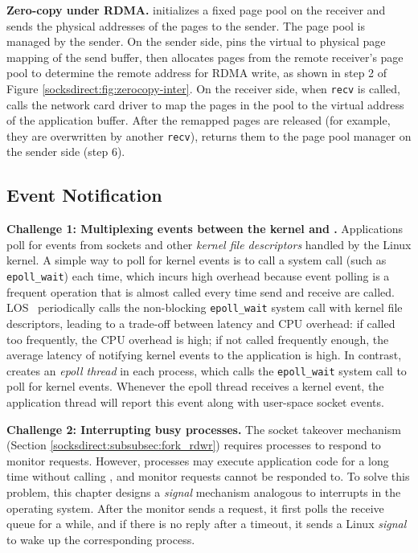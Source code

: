 \textbf{Zero-copy under RDMA.}
\libipc{} initializes a fixed page pool on the receiver and sends the physical addresses of the pages to the sender.
The page pool is managed by the sender.
On the sender side, \libipc{} pins the virtual to physical page mapping of the send buffer, then allocates pages from the remote receiver's page pool to determine the remote address for RDMA write, as shown in step 2 of Figure \ref{socksdirect:fig:zerocopy-inter}.
On the receiver side, when \texttt{recv} is called, \libipc calls the network card driver to map the pages in the pool to the virtual address of the application buffer.
After the remapped pages are released (for example, they are overwritten by another \texttt{recv}), \libipc{} returns them to the page pool manager on the sender side (step 6).

\subsection{Event Notification}
\label{socksdirect:subsec:process-mux}

\textbf{Challenge 1: Multiplexing events between the kernel and \libipc{}.}
Applications poll for events from sockets and other \textit{kernel file descriptors} handled by the Linux kernel.
A simple way to poll for kernel events is to call a system call (such as \texttt{epoll\_wait}) each time, which incurs high overhead because event polling is a frequent operation that is almost called every time send and receive are called.
LOS~\cite{huang2017high} periodically calls the non-blocking \texttt{epoll\_wait} system call with kernel file descriptors, leading to a trade-off between latency and CPU overhead: if called too frequently, the CPU overhead is high; if not called frequently enough, the average latency of notifying kernel events to the application is high.
In contrast, \libipc{} creates an \textit{epoll thread} in each process, which calls the \texttt{epoll\_wait} system call to poll for kernel events. Whenever the epoll thread receives a kernel event, the application thread will report this event along with user-space socket events.

\textbf{Challenge 2: Interrupting busy processes.}
The socket takeover mechanism (Section \ref{socksdirect:subsubsec:fork_rdwr}) requires processes to respond to monitor requests. However, processes may execute application code for a long time without calling \libipc{}, and monitor requests cannot be responded to. To solve this problem, this chapter designs a \textit{signal} mechanism analogous to interrupts in the operating system. After the monitor sends a request, it first polls the receive queue for a while, and if there is no reply after a timeout, it sends a Linux \textit{signal} to wake up the corresponding process.

